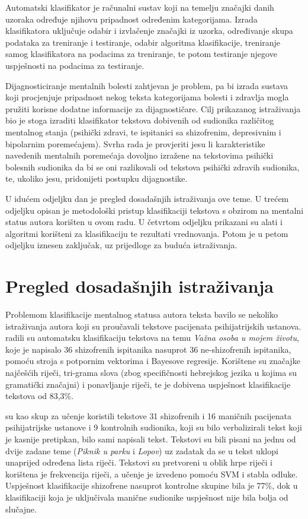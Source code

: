 \documentclass[10pt, a4paper]{article}
\begin{document}
Automatski klasifikator je računalni sustav koji na temelju značajki danih uzoraka određuje njihovu pripadnost određenim kategorijama. Izrada klasifikatora uključuje odabir i izvlačenje značajki iz uzorka, određivanje skupa podataka za treniranje i testiranje, odabir algoritma klasifikacije, treniranje samog klasifikatora na podacima za treniranje, te potom testiranje njegove uspješnosti na podacima za testiranje. 

Dijagnosticiranje mentalnih bolesti zahtjevan je problem, pa bi izrada sustava koji procjenjuje pripadnost nekog teksta kategorijama bolesti i zdravlja mogla pružiti korisne dodatne informacije za dijagnostičare. Cilj prikazanog istraživanja bio je stoga izraditi klasifikator tekstova dobivenih od sudionika različitog mentalnog stanja (psihički zdravi, te ispitanici sa shizofrenim, depresivnim i bipolarnim poremećajem). Svrha rada je provjeriti jesu li karakteristike navedenih mentalnih poremećaja dovoljno izražene na tekstovima psihički bolesnih sudionika da bi se oni razlikovali od tekstova psihički zdravih sudionika, te, ukoliko jesu, pridonijeti postupku dijagnostike.

U idućem odjeljku dan je pregled dosadašnjih istraživanja ove teme. U trećem odjeljku opisan je metodološki pristup klasifikaciji tekstova s obzirom na mentalni status autora korišten u ovom radu. U četvrtom odjeljku prikazani su alati i algoritmi korišteni za klasifikaciju te rezultati vrednovanja. Potom je u petom odjeljku iznesen zaključak, uz prijedloge za buduća istraživanja.

\section{Pregled dosadašnjih istraživanja}
Problemom klasifikacije mentalnog statusa autora teksta bavilo se nekoliko istraživanja autora koji su proučavali tekstove pacijenata psihijatrijskih ustanova. \citet{strous-2009} radili su automatsku klasifikaciju tekstova na temu \emph{Važna osoba u mojem životu}, koje je napisalo 36 shizofrenih ispitanika nasuprot 36 ne-shizofrenih ispitanika, pomoću stroja s potpornim vektorima  i Bayesove regresije. Korištene su značajke najčešćih riječi, tri-grama slova (zbog specifičnosti hebrejskog jezika u kojima su gramatički značajni) i ponavljanje riječi, te je dobivena uspješnost klasifikacije tekstova od 83,3\%.

\citet{exray} su kao skup za učenje koristili tekstove 31 shizofrenih i 16 maničnih pacijenata psihijatrijske ustanove i 9 kontrolnih sudionika, koji su bilo verbalizirali tekst koji je kasnije pretipkan, bilo sami napisali tekst. Tekstovi su bili pisani na jednu od dvije zadane teme (\emph{Piknik u parku} i \emph{Lopov}) uz zadatak da se u tekst uklopi unaprijed određena lista riječi. Tekstovi su pretvoreni u oblik hrpe riječi  i korištena je frekvencija riječi, a učenje je izvedeno pomoću SVM i stabla odluke. Uspješnost klasifikacije shizofrene nasuprot kontrolne skupine bila je 77\%, dok u klasifikaciji koja je uključivala manične sudionike uspješnost nije bila bolja od slučajne. 
\end{document}
